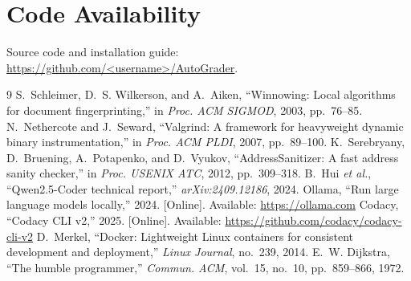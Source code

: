 \documentclass[conference]{IEEEtran}
\begin{document}
\section*{Code Availability}
Source code and installation guide: \url{https://github.com/<username>/AutoGrader}.

\begin{thebibliography}{9}
 S.~Schleimer, D.~S. Wilkerson, and A.~Aiken, ``Winnowing: Local
algorithms for document fingerprinting,'' in \emph{Proc. ACM SIGMOD}, 2003, pp.~76--85.
 N.~Nethercote and J.~Seward, ``Valgrind: A framework for heavyweight
dynamic binary instrumentation,'' in \emph{Proc. ACM PLDI}, 2007, pp.~89--100.
 K.~Serebryany, D.~Bruening, A.~Potapenko, and D.~Vyukov,
``AddressSanitizer: A fast address sanity checker,'' in \emph{Proc. USENIX ATC}, 2012,
pp.~309--318.
 B.~Hui \emph{et al.}, ``Qwen2.5-Coder technical report,''
\emph{arXiv:2409.12186}, 2024.
 Ollama, ``Run large language models locally,'' 2024. [Online]. Available:
\url{https://ollama.com}
 Codacy, ``Codacy CLI v2,'' 2025. [Online]. Available:
\url{https://github.com/codacy/codacy-cli-v2}
 D.~Merkel, ``Docker: Lightweight Linux containers for consistent
development and deployment,'' \emph{Linux Journal}, no.~239, 2014.
 E.~W. Dijkstra, ``The humble programmer,'' \emph{Commun. ACM},
vol.~15, no.~10, pp.~859--866, 1972.
\end{thebibliography}
\end{document}

